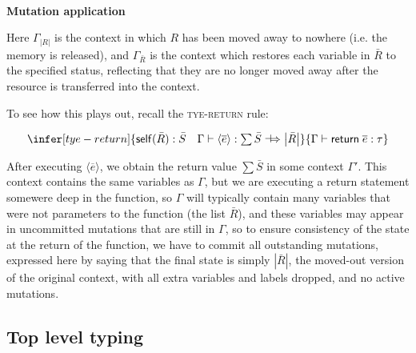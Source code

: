 \documentclass[acmsmall,nonacm]{acmart}
\newcommand{\core}[1]{\left| #1 \right|}
\newcommand{\proves}{\vdash}
\newcommand{\constep}{\Rightarrow}
\newcommand{\makesto}{\dashv\!\constep}
\newcommand{\judgment}[2][]{\noindent\\\textbf{#1}\hspace{\stretch{1}}\fbox{$#2$}\nopagebreak}
\newcommand*{\axiom}[2][]{\infer[#1]{}{#2}}
\begin{document}
\judgment[Mutation application]{\Gamma \constep\Gamma'}
Here $\Gamma_{|R|}$ is the context in which $R$ has been moved away to nowhere (i.e. the memory is released), and $\Gamma_{\bar R}$ is the context which restores each variable in $\bar R$ to the specified status, reflecting that they are no longer moved away after the resource is transferred into the context.

To see how this plays out, recall the \textsc{tye-return} rule:

$$\infer[tye-return]
    {\mathsf{self}(\bar R):\bar S\quad
      \Gamma \proves \langle\overline{e}\rangle:\textstyle\sum\bar S\makesto \core{\bar R}}
    {\Gamma \proves \mathsf{return}\;\overline{e}:\tau}$$

After executing $\langle\overline{e}\rangle$, we obtain the return value $\sum\bar S$ in some context $\Gamma'$. This context contains the same variables as $\Gamma$, but we are executing a return statement somewere deep in the function, so $\Gamma$ will typically contain many variables that were not parameters to the function (the list $\bar R$), and these variables may appear in uncommitted mutations that are still in $\Gamma$, so to ensure consistency of the state at the return of the function, we have to commit all outstanding mutations, expressed here by saying that the final state is simply $\core{\bar R}$, the moved-out version of the original context, with all extra variables and labels dropped, and no active mutations.

\subsection{Top level typing}
\end{document}
